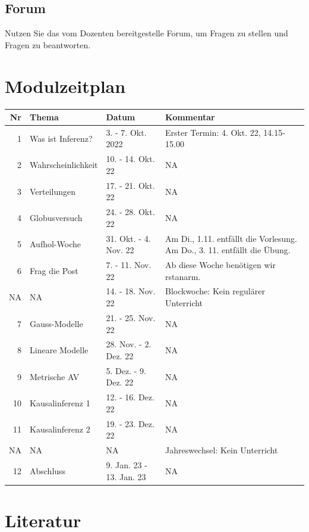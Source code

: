 \documentclass[
  a4paper,
  DIV=11]{scrreprt}
\theoremstyle{definition}
\theoremstyle{remark}
\begin{document}
\hypertarget{forum}{%
\subsection*{Forum}\label{forum}}

Nutzen Sie das vom Dozenten bereitgestelle Forum, um Fragen zu stellen
und Fragen zu beantworten.

\hypertarget{modulzeitplan}{%
\section*{Modulzeitplan}\label{modulzeitplan}}


\begin{longtable}{rlll}
\toprule
Nr & Thema & Datum & Kommentar \\ 
\midrule
1 & Was ist Inferenz? & 3. - 7. Okt. 2022 & Erster Termin: 4. Okt. 22, 14.15-15.00 \\ 
2 & Wahrscheinlichkeit & 10. - 14. Okt. 22 & NA \\ 
3 & Verteilungen & 17. - 21. Okt. 22 & NA \\ 
4 & Globusversuch & 24. - 28. Okt. 22 & NA \\ 
5 & Aufhol-Woche & 31. Okt. - 4. Nov. 22 & Am Di., 1.11. entfällt die Vorlesung. Am Do., 3. 11. entfällt die Übung. \\ 
6 & Frag die Post & 7. - 11. Nov. 22 & Ab diese Woche benötigen wir rstanarm. \\ 
NA & NA & 14. - 18. Nov. 22 & Blockwoche: Kein regulärer Unterricht \\ 
7 & Gauss-Modelle & 21. - 25. Nov. 22 & NA \\ 
8 & Lineare Modelle & 28. Nov. - 2. Dez. 22 & NA \\ 
9 & Metrische AV & 5. Dez. - 9. Dez. 22 & NA \\ 
10 & Kausalinferenz 1 & 12. - 16. Dez. 22 & NA \\ 
11 & Kausalinferenz 2 & 19. - 23. Dez. 22 & NA \\ 
NA & NA & NA & Jahreswechsel: Kein Unterricht \\ 
12 & Abschluss & 9. Jan. 23 - 13. Jan. 23 & NA \\ 
\bottomrule
\end{longtable}

\hypertarget{literatur}{%
\section*{Literatur}\label{literatur}}
\end{document}

